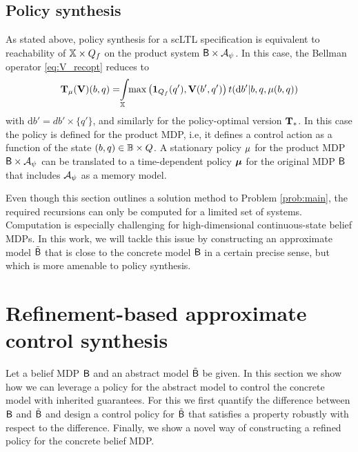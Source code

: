 \documentclass{ifacconf}
\begin{document}
\subsection{Policy synthesis}

As stated above, policy synthesis for a scLTL specification is equivalent to reachability of ${\mathbb{X}} \times Q_f$ on the product system $\mathsf{B} \times \mathcal{A}_\psi$. In this case, the Bellman operator \eqref{eq:V_recopt} reduces to
\begin{equation}
\label{eq:V_recopt_inf_mu}
\begin{aligned}
  \Bel_\pol (\mathbf V)(b,q) = \hspace{-1mm} \int_{\X} \hspace{-1mm} \max \left( \mathbf 1_{Q_f}(q'), \mathbf V( b', q') \right) {\tr}(\mathrm{d} b' |b,q,\pol(b,q))
\end{aligned}
\end{equation}
with $\mathrm{d} b'= d b'\times\{q'\}$, and similarly for the policy-optimal version ${\mathbf {T}}_\ast$. In this case the policy is defined for the product MDP, i.e, it defines a control action as a function of the state $(b,q) \in \mathbb{B} \times Q$. A stationary policy ${\mu}$ for the product MDP $\mathsf{B} \times \mathcal{A}_\psi$ can be translated to a time-dependent policy ${\boldsymbol{\mu}}$ for the original MDP $\mathsf{B}$ that includes $\mathcal{A}_\psi$ as a memory model.

Even though this section outlines a solution method to Problem \ref{prob:main}, the required recursions can only be computed for a limited set of systems.
Computation is especially challenging for high-dimensional continuous-state belief MDPs. In this work, we will tackle this issue by constructing an approximate model $\tilde {\mathsf{B}}$ that is close to the concrete model $\mathsf{B}$ in a certain precise sense, but which is more amenable to policy synthesis.


\section{Refinement-based approximate control synthesis}
\label{sec:refinement}

Let a belief MDP $\mathsf{B}$ and an abstract model $\tilde {\mathsf{B}}$ be given. In this section we show how we can leverage a policy for the abstract model to control the concrete model with inherited guarantees. For this we first quantify the difference between $\mathsf{B}$ and $\tilde {\mathsf{B}}$ and design a control policy for $\tilde {\mathsf{B}}$ that satisfies a property robustly with respect to the difference. Finally, we show a novel way of constructing a refined policy for the concrete belief MDP.
\end{document}
